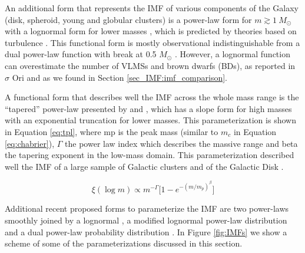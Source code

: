 \documentclass[12pt]{article}
\begin{document}
An additional form that represents the IMF of various components of the Galaxy (disk, spheroid, young and globular clusters) is a power-law form for $m\gtrsim1\ M_\odot$ with a lognormal form for lower masses \citep{Chabrier2001,Chabrier2003a,Chabrier2005a}, which is predicted by theories based on turbulence \citep[e.g. ][]{Hennebelle-Chabrier2008}. This functional form is mostly observational indistinguishable from a dual power-law function with break at 0.5 $M_\odot$ \citep{Dabringhausen2008,Kroupa2013}. However, a lognormal function can overestimate the number of VLMSs and brown dwarfs (\ac{BD}s), as reported in $\sigma$ Ori \citep{PenaRamirez2012} and as we found in Section \ref{sec_IMF:imf_comparison}.

A functional form that describes well the IMF across the whole mass range is the ``tapered'' power-law presented by \citet{DeMarchi-Paresce2001} and \citet{DeMarchi2005}, which has a slope form for high masses with an exponential truncation for lower masses. This parameterization is shown in Equation \ref{eq:tpl}, where \ac{mp} is the peak mass (similar to $m_c$ in Equation \ref{eq:chabrier}), $\Gamma$ the power law index which describes the massive range and \ac{beta} the tapering exponent in the low-mass domain. This parameterization described well the IMF of a large sample of Galactic clusters and of the Galactic Disk \citep{Bastian2010,DeMarchi2010,Parravano2011}.

\begin{equation}
	\xi(\log m)\propto m^{-\Gamma} \Big[1-e^{-(m/m_p)^\beta}\Big]
	\label{eq:tpl}
\end{equation}

Additional recent proposed forms to parameterize the IMF are two power-laws smoothly joined by a lognormal \citep{Maschberger2013}, a modified lognormal power-law distribution \citep{Basu2015} and a dual power-law probability distribution \citep{Hoffmann2018}. In Figure \ref{fig:IMFs} we show a scheme of some of the parameterizations discussed in this section.
\end{document}
